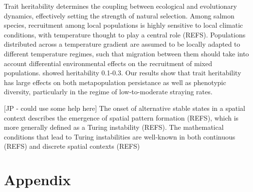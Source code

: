 \documentclass[twocolumn,preprintnumbers,amsmath,amssymb,superscriptaddress]{revtex4}
\begin{document}
Trait heritability determines the coupling between ecological and evolutionary dynamics, effectively setting the strength of natural selection.
Among salmon species, recruitment among local populations is highly sensitive to local climatic conditions, with temperature thought to play a central role (REFS).
Populations distributed across a temperature gradient are assumed to be locally adapted to different temperature regimes, such that migration between them should take into account differential environmental effects on the recruitment of mixed populations.
\citeauthor{Carlson:2008hl} showed heritability 0.1-0.3.
Our results show that trait heritability has large effects on both metapopulation persistance as well as phenotypic diversity, particularly in the regime of low-to-moderate straying rates.



[JP - could use some help here]
The onset of alternative stable states in a spatial context describes the emergence of spatial pattern formation (REFS), which is more generally defined as a Turing instability (REFS).
The mathematical conditions that lead to Turing instabilities are well-known in both continuous (REFS) and discrete spatial contexts (REFS)






\setcounter{figure}{0}
\section*{Appendix}
\end{document}
